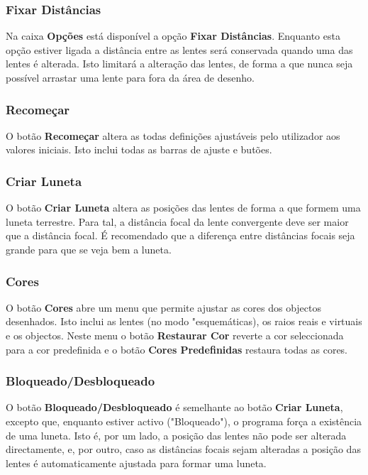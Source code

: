 \documentclass{scrartcl}
\begin{document}
\subsubsection{Fixar Distâncias}

Na caixa {\bf Opções} está disponível a opção {\bf Fixar Distâncias}. Enquanto esta opção estiver ligada a distância entre as lentes será conservada quando uma das lentes é alterada. Isto limitará a alteração das lentes, de forma a que nunca seja possível arrastar uma lente para fora da área de desenho.
\par

\subsubsection{Recomeçar}

O botão {\bf Recomeçar} altera as todas definições ajustáveis pelo utilizador aos valores iniciais. Isto inclui todas as barras de ajuste e butões.
\par

\subsubsection{Criar Luneta}

O botão {\bf Criar Luneta} altera as posições das lentes de forma a que formem uma luneta terrestre. Para tal, a distância focal da lente convergente deve ser maior que a distância focal. É recomendado que a diferença entre distâncias focais seja grande para que se veja bem a luneta.
\par

\subsubsection{Cores}

O botão {\bf Cores} abre um menu que permite ajustar as cores dos objectos desenhados. Isto  inclui as lentes (no modo "esquemáticas), os raios reais e virtuais e os objectos. Neste menu o botão {\bf Restaurar Cor} reverte a cor seleccionada para a cor predefinida e o botão {\bf Cores Predefinidas} restaura todas as cores.
\par

\subsubsection{Bloqueado/Desbloqueado}

O botão {\bf Bloqueado/Desbloqueado} é semelhante ao botão {\bf Criar Luneta}, excepto que, enquanto estiver activo ("Bloqueado"), o programa força a existência de uma luneta. Isto é, por um lado, a posição das lentes não pode ser alterada directamente, e, por outro, caso as distâncias focais sejam alteradas a posição das lentes é automaticamente ajustada para formar uma luneta.
\end{document}
